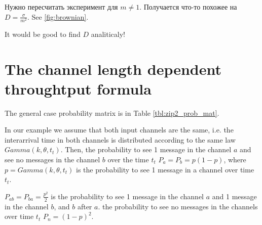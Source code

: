 Нужно пересчитать эксперимент для $m \neq 1$. Получается что-то похожее на $D = \frac{\sigma}{m^{2}}$. See \ref{fig:brownian}.

It would be good to find $D$ analiticaly!

  \section{The channel length dependent throughtput formula}
The general case probability matrix is in Table \ref{tbl:zip2_prob_mat}.

In our example we assume that both input channels are the same, i.e. the interarrival time in both channels is distributed according to the same law $Gamma(k,\theta,t_t)$. Then, the probability to see 1 message in the channel $a$ and see no messages in the channel $b$ over the time $t_t$ $P_a = P_b = p(1-p)$, where $p = Gamma(k,\theta,t_t)$ is the probability to see 1 message in a channel over time $t_t$.

$P_{ab} = P_{ba} = \frac{p^2}{2}$ is the probability to see 1 message in the channel $a$ and 1 message in the channel $b$, and $b$ after $a$. the probability to see no messages in the channels over time $t_t$ $P_n = (1-p)^2$.



